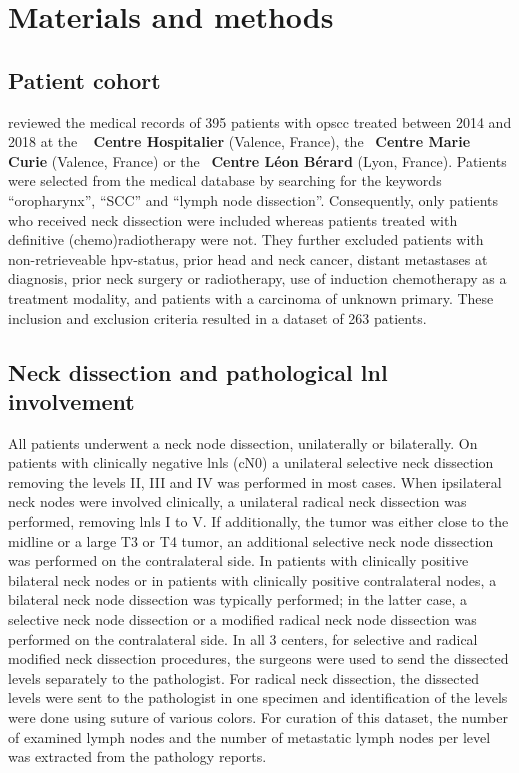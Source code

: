 \documentclass[\relativeRoot/main.tex]{subfiles}
\begin{document}
\section{Materials and methods}
\label{sec:dataset_clb:methods}

\subsection{Patient cohort}
\label{subsec:dataset_clb:methods:cohort}

 reviewed the medical records of 395 patients with \gls{opscc} treated between 2014 and 2018 at the ~\textbf{
Centre Hospitalier} (Valence, France), the ~\textbf{Centre Marie Curie} (Valence, France) or the ~\textbf{Centre Léon Bérard} (Lyon, France). Patients were selected from the medical database by searching for the keywords ``oropharynx'', ``SCC'' and ``lymph node dissection''. Consequently, only patients who received neck dissection were included whereas patients treated with definitive (chemo)radiotherapy were not. They further excluded patients with non-retrieveable \gls{hpv}-status, prior head and neck cancer, distant metastases at diagnosis, prior neck surgery or radiotherapy, use of induction chemotherapy as a treatment modality, and patients with a carcinoma of unknown primary. These inclusion and exclusion criteria resulted in a dataset of 263 patients.

\subsection{Neck dissection and pathological \acrshort{lnl} involvement}
\label{subsec:dataset_clb:methods:dissection}

All patients underwent a neck node dissection, unilaterally or bilaterally. On patients with clinically negative \glspl{lnl} (cN0) a unilateral selective neck dissection removing the levels II, III and IV was performed in most cases. When ipsilateral neck nodes were involved clinically, a unilateral radical neck dissection was performed, removing \glspl{lnl} I to V. If additionally, the tumor was either close to the midline or a large T3 or T4 tumor, an additional selective neck node dissection was performed on the contralateral side. In patients with clinically positive bilateral neck nodes or in patients with clinically positive contralateral nodes, a bilateral neck node dissection was typically performed; in the latter case, a selective neck node dissection or a modified radical neck node dissection was performed on the contralateral side. In all 3 centers, for selective and radical modified neck dissection procedures, the surgeons were used to send the dissected levels separately to the pathologist. For radical neck dissection, the dissected levels were sent to the pathologist in one specimen and identification of the levels were done using suture of various colors. For curation of this dataset, the number of examined lymph nodes and the number of metastatic lymph nodes per level was extracted from the pathology reports.
\end{document}
